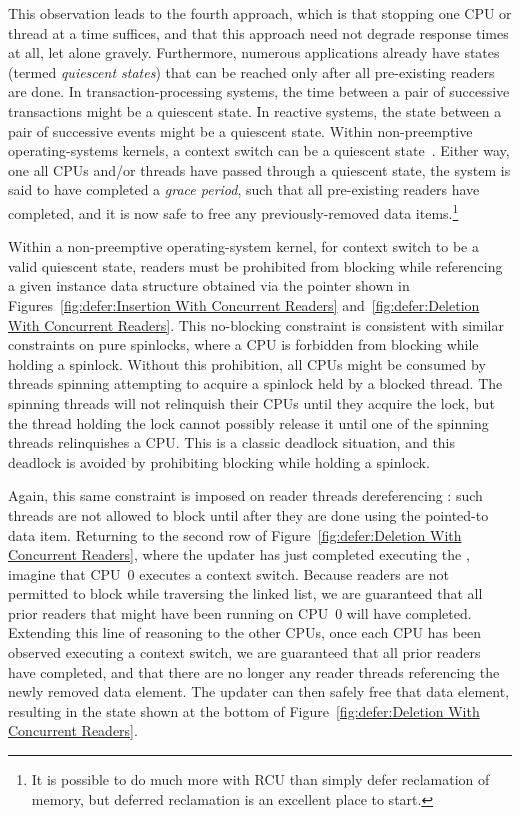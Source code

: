 This observation leads to the fourth approach, which is that stopping
one CPU or thread at a time suffices, and that this approach need not
degrade response times at all, let alone gravely.
Furthermore, numerous applications already have states (termed
\emph{quiescent states}) that can be
reached only after all pre-existing readers are done.
In transaction-processing systems, the time between a pair of
successive transactions might be a quiescent state.
In reactive systems, the state between a pair of successive events
might be a quiescent state.
Within non-preemptive operating-systems kernels, a context switch can be
a quiescent state~\cite{McKenney98}.
Either way, one all CPUs and/or threads have passed through a quiescent
state, the system is said to have completed a \emph{grace period},
such that all pre-existing readers have completed, and it is now
safe to free any previously-removed data items.\footnote{
	It is possible to do much more with RCU than simply defer
	reclamation of memory, but deferred reclamation is an
	excellent place to start.}

Within a non-preemptive operating-system kernel, for context switch to be
a valid quiescent state, readers must be prohibited from blocking while
referencing a given instance data structure obtained via the 
pointer shown in
Figures~\ref{fig:defer:Insertion With Concurrent Readers}
and~\ref{fig:defer:Deletion With Concurrent Readers}.
This no-blocking constraint is consistent with similar constraints
on pure spinlocks, where a CPU is forbidden from blocking while
holding a spinlock.
Without this prohibition, all CPUs might be consumed by threads
spinning attempting to acquire a spinlock held by a blocked thread.
The spinning threads will not relinquish their CPUs until they acquire
the lock, but the thread holding the lock cannot possibly release it
until one of the spinning threads relinquishes a CPU.
This is a classic deadlock situation, and this deadlock is avoided
by prohibiting blocking while holding a spinlock.

Again, this same constraint is imposed on reader threads dereferencing
: such threads are not allowed to block until after
they are done using the pointed-to data item.
Returning to the second row of
Figure~\ref{fig:defer:Deletion With Concurrent Readers},
where the updater has just completed executing the ,
imagine that CPU~0 executes a context switch.
Because readers are not permitted to block while traversing the linked
list, we are guaranteed that all prior readers that might have been running on
CPU~0 will have completed.
Extending this line of reasoning to the other CPUs, once each CPU has
been observed executing a context switch, we are guaranteed that all
prior readers have completed, and that there are no longer any reader
threads referencing the newly removed data element.
The updater can then safely free that data element, resulting in the
state shown at the bottom of
Figure~\ref{fig:defer:Deletion With Concurrent Readers}.

